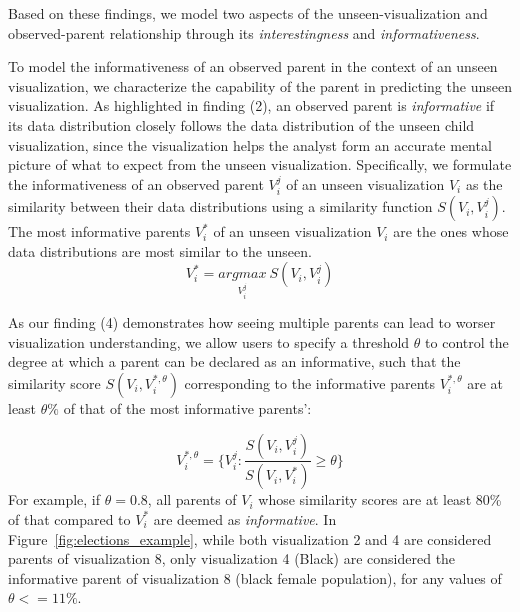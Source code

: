 Based on these findings, we model two aspects of the unseen-visualization and observed-parent relationship through its \textit{interestingness} and \textit{informativeness}. 

 To model the informativeness of an observed parent in the context of an unseen visualization, we characterize the capability of the parent in predicting the unseen visualization. As highlighted in finding (2), an observed parent is \emph{informative} if its data distribution closely follows the data distribution of the unseen child visualization, since the visualization helps the analyst form an accurate mental picture of what to expect from the unseen visualization. Specifically, we formulate the informativeness of an observed parent $V_i^j$ of an unseen visualization $V_i$ as the similarity between their data distributions using a similarity function $S(V_i, V_i^j)$. The most informative parents $V_i^*$ of an unseen visualization $V_i$ are the ones whose data distributions are most similar to the unseen.
\begin{equation}
    V_i^*=\underset{V_i^j}{argmax}\ S(V_i, V_i^j)
\end{equation}

As our finding (4) demonstrates how seeing multiple parents can lead to worser visualization understanding, we allow users to specify a threshold $\theta$ to control the degree at which a parent can be declared as an informative, such that the similarity score $S(V_i, V_i^{*, \theta})$ corresponding to the informative parents $V_i^{*, \theta}$ are at least $\theta\%$ of that of the most informative parents': 

\begin{equation}
    V_i^{*, \theta} = \{V_i^j : \frac{S(V_i, V_i^j)}{S(V_i, V_i^*)} \ge \theta\}
\end{equation}
For example, if $\theta = 0.8$, all parents of $V_i$ whose similarity scores are at least 80\% of that compared to $V_i^*$ are deemed as \textit{informative}. In Figure~\ref{fig:elections_example}, while both visualization 2 and 4 are considered parents of visualization 8, only visualization 4 (Black) are considered the informative parent of visualization 8 (black female population), for any values of $\theta <= 11\%$. %

